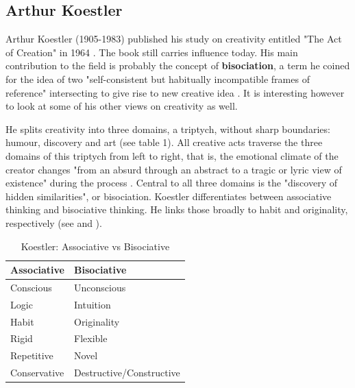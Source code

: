 \subsection{Arthur Koestler}

Arthur Koestler (1905-1983) published his study on creativity entitled "The Act of Creation" in 1964 \citep{Koestler1964}. The book still carries influence today. His main contribution to the field is probably the concept of \textbf{bisociation}, a term he coined for the idea of two "self-consistent but habitually incompatible frames of reference" intersecting to give rise to new creative idea \citep[p.35]{Koestler1964}. It is interesting however to look at some of his other views on creativity as well.

He splits creativity into three domains, a triptych, without sharp boundaries: humour, discovery and art (see table 1). All creative acts traverse the three domains of this triptych from left to right, that is, the emotional climate of the creator changes "from an absurd through an abstract to a tragic or lyric view of existence" during the process \citep[p.27]{Koestler1964}. Central to all three domains is the "discovery of hidden similarities", or bisociation. Koestler differentiates between associative thinking and bisociative thinking. He links those broadly to habit and originality, respectively (see  and ).

\begin{table}[htbp]
\centering
\begin{tabular}{|l|l|}
\hline
\textbf{Associative} & \textbf{Bisociative}     \\ \hline
Conscious            & Unconscious              \\ \hline
Logic                & Intuition                \\ \hline
Habit                & Originality              \\ \hline
Rigid                & Flexible                 \\ \hline
Repetitive           & Novel                    \\ \hline
Conservative         & Destructive/Constructive \\ \hline
\end{tabular}
\caption[Associative vs Bisociative]{Koestler: Associative vs Bisociative}
\label{KoestlerAB}
\end{table}


